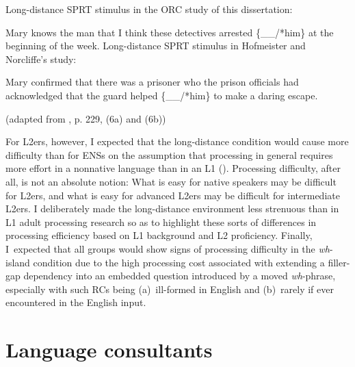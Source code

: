 \pex\label{ex-complexity}
\a Long-distance SPRT stimulus in the ORC study of this dissertation: \par\nobreak\vspace{5pt}\label{ex-complexity-a}
Mary knows the man that I think these detectives arrested \{\_\_/*him\} at the beginning \linebreak of the week.
\a Long-distance SPRT stimulus in Hofmeister and Norcliffe's study: \par\nobreak\vspace{5pt}\label{ex-complexity-b}
Mary confirmed that there was a prisoner who the prison officials had acknowledged that the guard helped \{\_\_/*him\} to make a daring escape. \par\nobreak\vspace{5pt}
\hfill (adapted from \cite{hofmeister.norcliffe2013}, p. 229, (6a) and (6b))
\xe 

\noindent For L2ers, however, I expected that the long-distance condition would cause more difficulty than for ENSs on the assumption that processing in general requires more effort in a nonnative language than in an L1 (\cite{hopp2014,kilborn1992}). Processing difficulty, after all, is not an absolute notion: What is easy for native speakers may be difficult for L2ers, and what is easy for advanced L2ers may be difficult for intermediate L2ers. I deliberately made the long-distance environment less strenuous than in L1 adult processing research so as to highlight these sorts of differences in processing efficiency based on L1 background and L2 proficiency. Finally, I~expected that all groups would show signs of processing difficulty in the \textit{wh}-island condition due to the high processing cost associated with extending a filler-gap dependency into an embedded question introduced by a moved \textit{wh}-phrase, especially with such RCs being (a)~ill-formed in English and (b)~rarely if ever encountered in the English input.

\section{Language consultants}\label{stu-consultant}

